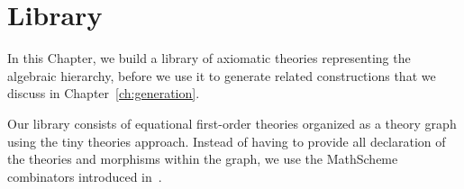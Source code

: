 \chapter{Library}
\label{ch:library}

In this Chapter, we build a library of axiomatic theories representing the algebraic hierarchy, before we use it to generate related constructions that we discuss in Chapter~\ref{ch:generation}. 

Our library consists of equational first-order theories organized as a theory graph using the tiny theories approach. Instead of having to provide all declaration of the theories and morphisms within the graph, we use the MathScheme combinators introduced in~\cite{CaretteOConnorTPC, carette2018building}. 


